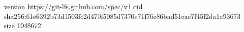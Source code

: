 version https://git-lfs.github.com/spec/v1
oid sha256:61e6392b73d1503fc2d470f5085d7370e71f76e86bad51eae7f45f2da1a93673
size 1048672
